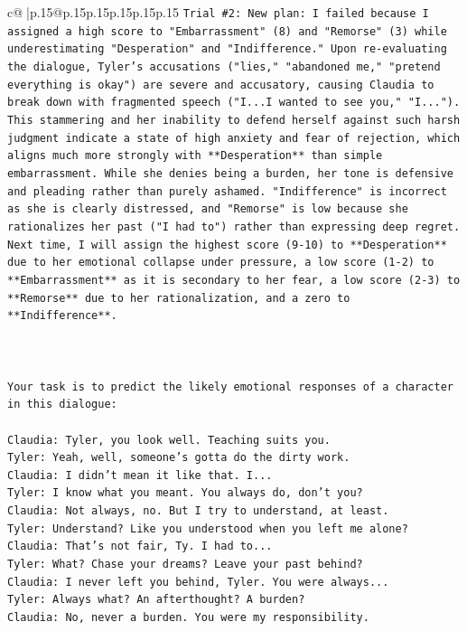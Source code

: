 \documentclass{article}
\begin{document}
{\begin{supertabular}{c@{$\;$}|p{.15\linewidth}@{}p{.15\linewidth}p{.15\linewidth}p{.15\linewidth}p{.15\linewidth}p{.15\linewidth}}
{{{\texttt{Trial \#2: New plan: I failed because I assigned a high score to "Embarrassment" (8) and "Remorse" (3) while underestimating "Desperation" and "Indifference." Upon re{-}evaluating the dialogue, Tyler's accusations ("lies," "abandoned me," "pretend everything is okay") are severe and accusatory, causing Claudia to break down with fragmented speech ("I...I wanted to see you," "I..."). This stammering and her inability to defend herself against such harsh judgment indicate a state of high anxiety and fear of rejection, which aligns much more strongly with **Desperation** than simple embarrassment. While she denies being a burden, her tone is defensive and pleading rather than purely ashamed. "Indifference" is incorrect as she is clearly distressed, and "Remorse" is low because she rationalizes her past ("I had to") rather than expressing deep regret. Next time, I will assign the highest score (9{-}10) to **Desperation** due to her emotional collapse under pressure, a low score (1{-}2) to **Embarrassment** as it is secondary to her fear, a low score (2{-}3) to **Remorse** due to her rationalization, and a zero to **Indifference**.} \\
\\ 
\\ 
\\ 
\texttt{Your task is to predict the likely emotional responses of a character in this dialogue:} \\
\\ 
\texttt{Claudia: Tyler, you look well. Teaching suits you.} \\
\texttt{Tyler: Yeah, well, someone's gotta do the dirty work.} \\
\texttt{Claudia: I didn't mean it like that. I...} \\
\texttt{Tyler: I know what you meant. You always do, don't you?} \\
\texttt{Claudia: Not always, no. But I try to understand, at least.} \\
\texttt{Tyler: Understand? Like you understood when you left me alone?} \\
\texttt{Claudia: That's not fair, Ty. I had to...} \\
\texttt{Tyler: What? Chase your dreams? Leave your past behind?} \\
\texttt{Claudia: I never left you behind, Tyler. You were always...} \\
\texttt{Tyler: Always what? An afterthought? A burden?} \\
\texttt{Claudia: No, never a burden. You were my responsibility.} \\
}}}
\end{supertabular}}
\end{document}
